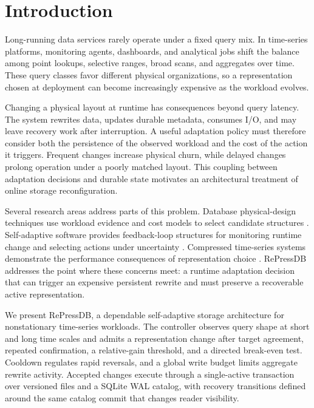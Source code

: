 \documentclass[final,5p,times,twocolumn,authoryear]{elsarticle}
\begin{document}
\section{Introduction}
\label{sec:introduction}

Long-running data services rarely operate under a fixed query mix. In time-series platforms, monitoring agents, dashboards, and analytical jobs shift the balance among point lookups, selective ranges, broad scans, and aggregates over time. These query classes favor different physical organizations, so a representation chosen at deployment can become increasingly expensive as the workload evolves.

Changing a physical layout at runtime has consequences beyond query latency. The system rewrites data, updates durable metadata, consumes I/O, and may leave recovery work after interruption. A useful adaptation policy must therefore consider both the persistence of the observed workload and the cost of the action it triggers. Frequent changes increase physical churn, while delayed changes prolong operation under a poorly matched layout. This coupling between adaptation decisions and durable state motivates an architectural treatment of online storage reconfiguration.

Several research areas address parts of this problem. Database physical-design techniques use workload evidence and cost models to select candidate structures \citep{chaudhuri1997autoadmin,bruno2005physical,vanaken2017ottertune,pavlo2017selfdriving}. Self-adaptive software provides feedback-loop structures for monitoring runtime change and selecting actions under uncertainty \citep{kephart2003vision,garlan2004rainbow,salehie2009landscape,delemos2013roadmap}. Compressed time-series systems demonstrate the performance consequences of representation choice \citep{pelkonen2015gorilla,andersen2016btrdb,blalock2018sprintz}. RePressDB addresses the point where these concerns meet: a runtime adaptation decision that can trigger an expensive persistent rewrite and must preserve a recoverable active representation.

We present RePressDB, a dependable self-adaptive storage architecture for nonstationary time-series workloads. The controller observes query shape at short and long time scales and admits a representation change after target agreement, repeated confirmation, a relative-gain threshold, and a directed break-even test. Cooldown regulates rapid reversals, and a global write budget limits aggregate rewrite activity. Accepted changes execute through a single-active transaction over versioned files and a SQLite WAL catalog, with recovery transitions defined around the same catalog commit that changes reader visibility.
\end{document}
